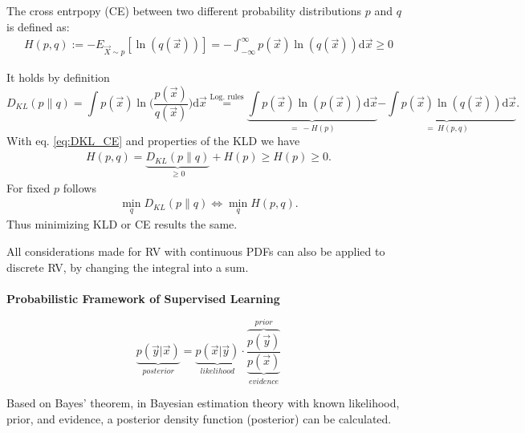 \begin{definition}
The cross entrpopy (CE) between two different probability distributions $p$ and $q$ is defined as:
\begin{align}
    H(p,q) := -E_{\vec{X}\sim p} \left[\ln(q(\vec{x}))\right] = - \int_{-\infty}^{\infty}p(\vec{x})\ln(q(\vec{x}))\mathrm{d}\vec{x} \geq 0
\end{align}
\end{definition}

It holds by definition
\begin{equation}
D_{KL}(p \parallel q) = \int p(\vec{x}) \ln\biggl(\frac{p(\vec{x})}{q(\vec{x})}\biggr) \mathrm{d}\vec{x} \overset{\text{Log. rules}}{=} \underbrace{\int p(\vec{x}) \ln(p(\vec{x}))\mathrm{d}\vec{x}}_{=\:-H(p)} \underbrace{- \int p(\vec{x}) \ln(q(\vec{x})) \mathrm{d}\vec{x}}_{=\:H(p,q)}.
\label{eq:DKL_CE}
\end{equation}
With eq. \ref{eq:DKL_CE} and properties of the KLD we have
\begin{align}
    H(p,q) = \underbrace{D_{KL}(p\parallel q)}_{\geq 0} + H(p) \geq H(p) \geq 0.
\end{align}
For fixed $p$ follows
\begin{align}
    \min_q D_{KL} (p \parallel q) \Leftrightarrow \min_q H(p,q).
    \label{eq:optim_CE}
\end{align}
Thus minimizing KLD or CE results the same. 

All considerations made for RV with continuous PDFs can also be applied to discrete RV, by changing the integral into a sum.
\\
\\
\textbf{Probabilistic Framework of Supervised Learning}
\begin{definition}
\begin{equation}
    \underbrace{p(\vec{y}|\vec{x})}_{posterior} = \underbrace{p(\vec{x}|\vec{y})}_{likelihood} \cdot \frac{\overbrace{p(\vec{y})}^{prior}}{\underbrace{p(\vec{x})}_{evidence}}
\end{equation}
\end{definition}
Based on Bayes' theorem, in Bayesian estimation theory with known likelihood, prior, and evidence, a posterior density function (posterior) can be calculated.

